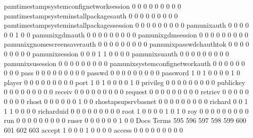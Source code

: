 \documentclass[compress,8pt]{beamer}
\begin{document}
\begin{frame}
\begin{Schunk}
  pamtimestampsystemconfignetworksession     0   0   0   0   0   0   0   0   0
  pamtimestampsysteminstallpackagesauth      0   0   0   0   0   0   0   0   0
  pamtimestampsysteminstallpackagessession   0   0   0   0   0   0   0   0   0
  pamunixauth                                0   0   0   0   0   0   1   0   0
  pamunixgdmauth                             0   0   0   0   0   0   0   0   0
  pamunixgdmsession                          0   0   0   0   0   0   0   0   0
  pamunixgnomescreensaverauth                0   0   0   0   0   0   0   0   0
  pamunixpasswdchauthtok                     0   0   0   0   0   0   0   0   0
  pamunixsession                             0   0   0   1   1   0   0   0   0
  pamunixsuauth                              0   0   0   0   0   0   0   0   0
  pamunixsusession                           0   0   0   0   0   0   0   0   0
  pamunixsystemconfignetworkauth             0   0   0   0   0   0   0   0   0
  pass                                       0   0   0   0   0   0   0   0   0
  passwd                                     0   0   0   0   0   0   0   0   0
  password                                   1   0   1   0   0   0   0   1   0
  player                                     0   0   0   0   0   0   0   0   0
  port                                       1   0   1   0   0   0   0   1   0
  privileg                                   0   0   0   0   0   0   0   0   0
  publickey                                  0   0   0   0   0   0   0   0   0
  receiv                                     0   0   0   0   0   0   0   0   0
  request                                    0   0   0   0   0   0   0   0   0
  retriev                                    0   0   0   0   0   0   0   0   0
  rhost                                      0   0   0   0   0   0   1   0   0
  rhostapsupsrvbasnet                        0   0   0   0   0   0   0   0   0
  richard                                    0   0   1   1   1   0   0   0   0
  richarduid                                 0   0   0   0   0   0   0   0   0
  root                                       1   0   0   0   0   1   0   1   0
  roy                                        0   0   0   0   0   0   0   0   0
  run                                        0   0   0   0   0   0   0   0   0
  ruser                                      0   0   0   0   0   0   1   0   0
                                          Docs
Terms                                      595 596 597 598 599 600 601 602 603
  accept                                     1   0   0   0   1   0   0   0   0
  access                                     0   0   0   0   0   0   0   0   0

\end{Schunk}
\end{frame}
\end{document}
